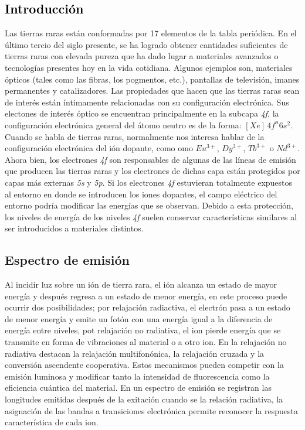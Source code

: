 \textcolor{black}{\section{Introducción}}

\noindent Las tierras raras están conformadas por 17 elementos de la tabla periódica. En el último tercio del siglo presente, se ha logrado obtener cantidades suficientes de tierras raras con elevada pureza que ha dado lugar a materiales avanzados o tecnologías presentes hoy en la vida cotidiana. Algunos ejemplos son, materiales ópticos (tales como las fibras, los pogmentos, etc.), pantallas de televisión, imanes permanentes y catalizadores\cite{Cheng2018}. 
Las propiedades que hacen que las tierras raras sean de interés están íntimamente relacionadas con su configuración electrónica. Sus electones de interés óptico se encuentran principalmente en la subcapa \textit{4f}, la configuración electrónica general del átomo neutro es de la forma: \([Xe]\,4f^n6s^2\). Cuando se habla de tierras raras, normalmente nos interesa hablar de la configuración electrónica del ión dopante, como omo \(Eu^{3+}\), \(Dy^{3+}\), \(Tb^{3+}\) o \(Nd^{3+}\). 
Ahora bien, los electrones \textit{4f} son responsables de algunas de las líneas de emisión que producen las tierras raras y los electrones de dichas capa están protegidos por capas más externas \textit{5s} y \textit{5p}\cite{Cheng2018}. Si los electrones \textit{4f} estuvieran totalmente expuestos al entorno en donde se introducen los iones dopantes, el campo eléctrico del entorno podría modificar las energías que se observan. Debido a esta protección, los niveles de energía de los niveles \textit{4f} suelen conservar características similares al ser introducidos a materiales distintos.
\subsection{Espectro de emisión}
Al incidir luz sobre un ión de tierra rara, el ión alcanza un estado de mayor energía y después regresa a un estado de menor energía, en este proceso puede ocurrir dos posibilidades; por relajación radiactiva, el electrón pasa a un estado de menor energía y emite un fotón con una energía igual a la diferencia de energía entre niveles, pot relajación no radiativa, el ion pierde energía que se transmite en forma de vibraciones al material o a otro ion. En la relajación no radiativa destacan la relajación multifonónica, la relajación cruzada y la conversión ascendente cooperativa\cite{RighiniFerrari2005}. Estos mecanismos pueden competir con la emisión luminosa y modificar tanto la intensidad de fluorescencia como la eficiencia cuántica del material.
En un espectro de emisión se registran las longitudes emitidas después de la exitación cuando se la relación radiativa, la asignación de las bandas a transiciones electrónica permite reconocer la respuesta característica de cada ion.
